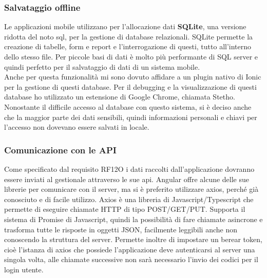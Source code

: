 \subsubsection{Salvataggio offline}
Le applicazioni mobile utilizzano per l'allocazione dati \textbf{SQLite}, una versione ridotta del noto \acrshort{sql}, per la gestione di
\gls{database} relazionali. SQLite permette la creazione di tabelle, form e report e l'interrogazione di questi, tutto all'interno dello
stesso file. Per piccole basi di dati è molto più performante di SQL server e quindi perfetto per il salvataggio di dati di un sistema
mobile. \\
\noindent Anche per questa funzionalità mi sono dovuto affidare a un plugin nativo di Ionic per la gestione di questi database. Per il
debugging e la visualizzazione di questi database ho utilizzato un estensione di Google Chrome, chiamata Stetho.\\
\noindent Nonostante il difficile accesso al database con questo sistema, si è deciso anche che la maggior parte dei dati sensibili, quindi
informazioni personali e chiavi per l'accesso non dovevano essere salvati in locale. 

\subsubsection{Comunicazione con le API}
Come specificato dal requisito RF12O i dati raccolti dall'applicazione dovranno essere inviati al gestionale attraverso le sue \gls{api}.
Angular offre alcune delle sue librerie per comunicare con il server, ma si è preferito utilizzare axios, perché già conosciuto e di facile
utilizzo. Axios è una libreria di Javascript/Typescript che permette di eseguire chiamate HTTP di tipo POST/GET/PUT. Supporta il sistema di
Promise di Javascript, quindi la possibilità di fare chiamate asincrone e trasforma tutte le risposte in oggetti JSON, facilmente leggibili
anche non conoscendo la struttura del server. Permette inoltre di impostare un berear token, cioè l'istanza di axios che possiede
l'applicazione deve autenticarsi al server una singola volta, alle chiamate successive non sarà necessario l'invio dei codici per il login
utente.

